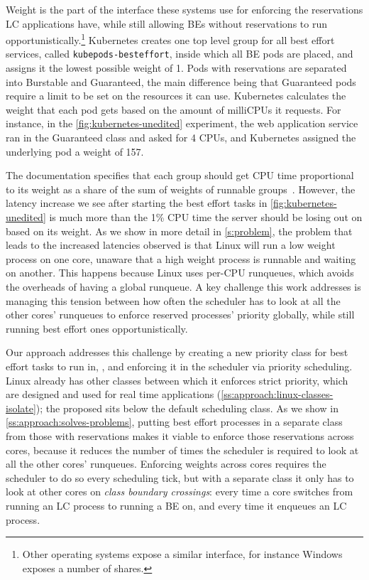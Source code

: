 Weight is the part of the \cgroups{} interface these systems use for enforcing
the reservations LC applications have, while still allowing BEs without
reservations to run opportunistically.\footnote{Other operating systems expose a
similar interface, for instance Windows exposes a number of shares.} Kubernetes
creates one top level group for all best effort services, called
\texttt{kubepods-besteffort}, inside which all BE pods are placed, and assigns
it the lowest possible weight of 1. Pods with reservations are separated into
Burstable and Guaranteed, the main difference being that Guaranteed pods require
a limit to be set on the resources it can use. Kubernetes calculates the weight
that each pod gets based on the amount of milliCPUs it requests. For instance,
in the \autoref{fig:kubernetes-unedited} experiment, the web application service
ran in the Guaranteed class and asked for 4 CPUs, and Kubernetes assigned the
underlying pod a weight of 157.

The \cgroups{} documentation specifies that each group should get CPU time
proportional to its weight as a share of the sum of weights of runnable
groups~\cite{cgroups-kerneldocs}. However, the latency increase we see after
starting the best effort tasks in \autoref{fig:kubernetes-unedited} is much more
than the 1\% CPU time the server should be losing out on based on its weight. As
we show in more detail in \autoref{s:problem}, the problem that leads to the
increased latencies observed is that Linux will run a low weight process on one
core, unaware that a high weight process is runnable and waiting on another.
This happens because Linux uses per-CPU runqueues, which avoids the overheads of
having a global runqueue. A key challenge this work addresses is managing this
tension between how often the scheduler has to look at all the other cores'
runqueues to enforce reserved processes' priority globally, while still running
best effort ones opportunistically.

Our approach addresses this challenge by creating a new priority class for best
effort tasks to run in, \beclass{}, and enforcing it in the scheduler via
priority scheduling. Linux already has other classes between which it enforces
strict priority, which are designed and used for real time applications
(\autoref{ss:approach:linux-classes-isolate}); the proposed \beclass{} sits
below the default scheduling class. As we show in
\autoref{ss:approach:solves-problems}, putting best effort processes in a
separate class from those with reservations makes it viable to enforce those
reservations across cores, because it reduces the number of times the scheduler
is required to look at all the other cores' runqueues. Enforcing weights across
cores requires the scheduler to do so every scheduling tick, but with a separate
class it only has to look at other cores on \textit{class boundary crossings}:
every time a core switches from running an LC process to running a BE on, and
every time it enqueues an LC process.

